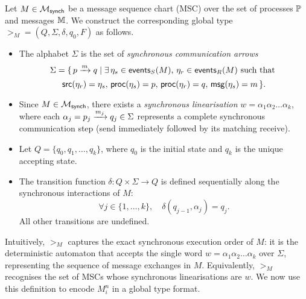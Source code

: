 \begin{definition}[$\gt_M$]\label{def:gm}
Let $M \in \mscsetofmodel{\synchmodel}$ be a message sequence chart (MSC)  
over the set of processes $\Procs$ and messages $\Messages$.  
We construct the corresponding global type $\gt_M = (Q, \Sigma, \delta, q_0, F)$  
as follows.

\begin{itemize}

    \item
    The alphabet $\Sigma$ is the set of \emph{synchronous communication arrows}  
    \[
        \Sigma = \{\, \marrow{p}{q}{m} \mid 
        \exists \, \event_s \in \sendeventsof{M}, \, 
        \event_r \in \receiveeventsof{M} \text{ such that }
	\]
    \[
        \source(\event_r) = \event_s, \, 
        \processof{\event_s}=p, \, \processof{\event_r}=q, \, 
        \messageof{\event_s}=m \,\}.
    \]

    \item
    Since $M \in \mscsetofmodel{\synchmodel}$, there exists a  
    \emph{synchronous linearisation}  
    $w = \alpha_1 \alpha_2 \ldots \alpha_k$,  
    where each $\alpha_j = \marrow{p_j}{q_j}{m_j} \in \Sigma$  
    represents a complete synchronous communication step (send immediately  
    followed by its matching receive).

    \item
    Let $Q = \{ q_0, q_1, \ldots, q_k \}$,  
    where $q_0$ is the initial state and $q_k$ is the unique accepting state.

    \item
    The transition function $\delta : Q \times \Sigma \to Q$  
    is defined sequentially along the synchronous interactions of $M$:  
    \[
        \forall j \in \{1, \ldots, k\}, \quad  
        \delta(q_{j-1}, \alpha_j) = q_j.
    \]
    All other transitions are undefined.

\end{itemize}

\end{definition}

Intuitively, $\gt_M$ captures the exact synchronous execution order of $M$:  
it is the deterministic automaton that accepts the single word  
$w = \alpha_1 \alpha_2 \ldots \alpha_k$ over $\Sigma$,  
representing the sequence of message exchanges in $M$.  
Equivalently, $\gt_M$ recognises the set of MSCs whose synchronous  
linearisations are $w$.
We now use this definition to encode $M_i^n$ in a global type format.

